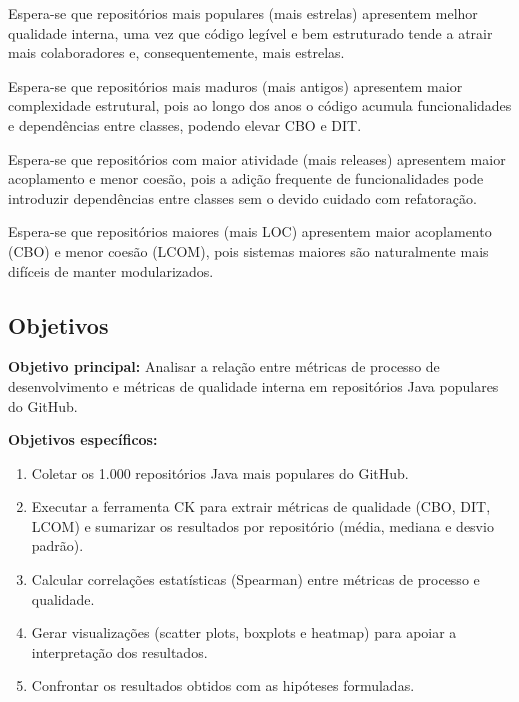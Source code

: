 \documentclass[12pt,a4paper]{article}
\begin{document}
\begin{description}[style=nextline, leftmargin=0.5cm]
    \item[\textbf{H1 (Popularidade):}] Espera-se que repositórios mais populares (mais estrelas) apresentem melhor qualidade interna, uma vez que código legível e bem estruturado tende a atrair mais colaboradores e, consequentemente, mais estrelas.

    \item[\textbf{H2 (Maturidade):}] Espera-se que repositórios mais maduros (mais antigos) apresentem maior complexidade estrutural, pois ao longo dos anos o código acumula funcionalidades e dependências entre classes, podendo elevar CBO e DIT.

    \item[\textbf{H3 (Atividade):}] Espera-se que repositórios com maior atividade (mais releases) apresentem maior acoplamento e menor coesão, pois a adição frequente de funcionalidades pode introduzir dependências entre classes sem o devido cuidado com refatoração.

    \item[\textbf{H4 (Tamanho):}] Espera-se que repositórios maiores (mais LOC) apresentem maior acoplamento (CBO) e menor coesão (LCOM), pois sistemas maiores são naturalmente mais difíceis de manter modularizados.
\end{description}

\subsection{Objetivos}

\textbf{Objetivo principal:} Analisar a relação entre métricas de processo de desenvolvimento e métricas de qualidade interna em repositórios Java populares do GitHub.

\textbf{Objetivos específicos:}

\begin{enumerate}
    \item Coletar os 1.000 repositórios Java mais populares do GitHub.
    \item Executar a ferramenta CK para extrair métricas de qualidade (CBO, DIT, LCOM) e sumarizar os resultados por repositório (média, mediana e desvio padrão).
    \item Calcular correlações estatísticas (Spearman) entre métricas de processo e qualidade.
    \item Gerar visualizações (scatter plots, boxplots e heatmap) para apoiar a interpretação dos resultados.
    \item Confrontar os resultados obtidos com as hipóteses formuladas.
\end{enumerate}
\end{document}
